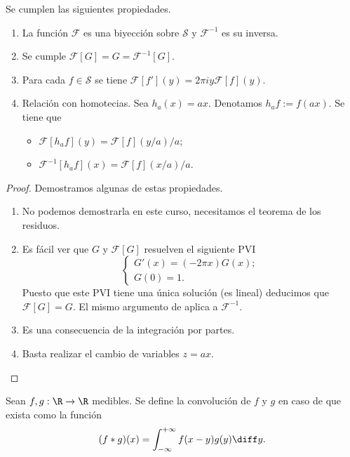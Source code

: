 \documentclass{article}
\begin{document}
\begin{theorem}
  \label{thm:transformada}
  Se cumplen las siguientes propiedades.
  \begin{enumerate}
  \item\label{item:fourier:inversa} La función $\mathcal{F}$ es una biyección sobre $\mathcal{S}$ y
    $\mathcal{F}^{-1}$ es su inversa.
  \item Se cumple $\mathcal{F}[G] = G = \mathcal{F}^{-1}[G]$.
  \item Para cada $f \in \mathcal{S}$ se tiene $\mathcal{F}[f'](y) = 2 \pi i y \mathcal{F}[f](y)$.
  \item Relación con homotecias. Sea $h_a(x) = ax$. Denotamos $h_a f := f(ax)$. Se tiene que
    \begin{itemize}
    \item $\mathcal{F}[h_a f](y) = \mathcal{F}[f](y/a)/a$;
    \item $\mathcal{F}^{-1}[h_a f](x) = \mathcal{F}[f](x/a)/a$.
    \end{itemize}
  \end{enumerate}
\end{theorem}
\begin{proof}
  Demostramos algunas de estas propiedades.
  \begin{enumerate}
  \item No podemos demostrarla en este curso, necesitamos el teorema de los residuos.
  \item Es fácil ver que $G$ y $\mathcal{F}[G]$ resuelven el siguiente PVI
    \[
      \begin{cases}
        G'(x) = (-2\pi x)G(x);\\
        G(0) = 1.
      \end{cases}
    \]
    Puesto que este PVI tiene una única solución (es lineal) deducimos que $\mathcal{F}[G] = G$. El
    mismo argumento de aplica a $\mathcal{F}^{-1}$.
  \item Es una consecuencia de la integración por partes.
  \item Basta realizar el cambio de variables $z = ax$. \qedhere
  \end{enumerate}
\end{proof}

\begin{definition}
  Sean $f,g : \R \to \R$ medibles. Se define la convolución de $f$ y $g$ en caso de que exista como la
  función
  \[ (f * g)(x) = \int_{-\infty}^{+\infty} f(x-y)g(y) \diff y. \]
\end{definition}
\end{document}
